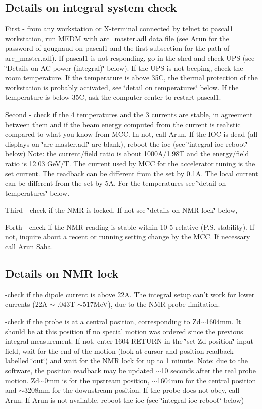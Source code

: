 \subsection{Details on integral system check }

First - from any workstation or X-terminal connected by telnet to pascal1 workstation,
run MEDM with arc\_master.adl data file (see Arun for the password of gougnaud
on pascal1 and the first subsection for the path of arc\_master.adl). If pascal1 is not
responding, go in the shed and check UPS (see \char`\"{}Details on AC power
(integral)\char`\"{} below). If the UPS is not beeping, check the room temperature.
If the temperature is above 35C, the thermal protection of the workstation is
probably activated, see \char`\"{}detail on temperatures\char`\"{} below. If
the temperature is below 35C, ask the computer center to restart pascal1. 

Second - check if the 4 temperatures and the 3 currents are stable, in agreement between
them and if the beam energy computed from the current is realistic compared
to what you know from MCC. In not, call Arun. If the IOC is dead (all displays
on \char`\"{}arc-master.adl\char`\"{} are blank), reboot the ioc (see \char`\"{}integral
ioc reboot\char`\"{} below) Note: the current/field ratio is about 1000A/1.98T
and the energy/field ratio is 12.03 GeV/T. The current used by MCC for the accelerator
tuning is the set current. The readback can be different from the set by 0.1A.
The local current can be different from the set by 5A. For the temperatures
see \char`\"{}detail on temperatures\char`\"{} below. 

Third - check if the NMR is locked. If not see \char`\"{}details on NMR lock\char`\"{}
below, 

Forth - check if the NMR reading is stable within 10-5 relative (P.S. stability).
If not, inquire about a recent or running setting change by the MCC. If necessary
call Arun Saha. 


\subsection{Details on NMR lock }

-check if the dipole current is above 22A. The integral setup can't work for
lower currents (22A \( \sim  \) .043T \( \sim  \)517MeV), due to the NMR probe
limitation. 

-check if the probe is at a central position, corresponding to Zd\( \sim  \)1604mm.
It should be at this position if no special motion was ordered since the previous
integral measurement. If not, enter 1604 RETURN in the \char`\"{}set Zd position\char`\"{}
input field, wait for the end of the motion (look at cursor and position readback
labelled \char`\"{}out\char`\"{}) and wait for the NMR lock for up to 1 minute.
Note: due to the software, the position readback may be updated \( \sim  \)10
seconds after the real probe motion. Zd\( \sim  \)0mm is for the upstream position,
\( \sim  \)1604mm for the central position and \( \sim  \)3208mm for the downstream
position. If the probe does not obey, call Arun. If Arun is not available, reboot
the ioc (see \char`\"{}integral ioc reboot\char`\"{} below) 

